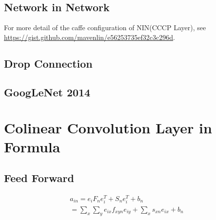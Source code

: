 \documentclass[12pt]{article}
\begin{document}
    \subsection{Network in Network}
    
    For more detail of the caffe configuration of NIN(CCCP Layer), see \url{https://gist.github.com/mavenlin/e56253735ef32c3c296d}.
    \subsection{Drop Connection}
    
    \subsection{GoogLeNet 2014}

\section{Colinear Convolution Layer in Formula}
    \subsection{Feed Forward}
    \begin{equation}
    \begin{array}{l}
    a_{in} = e_iF_ne_i^T + S_ne_i^T + b_n \\
    = \sum_x \sum_y e_{ix}f_{xyn}e_{iy} + \sum_x s_{xn}e_{ix} + b_n
    \end{array}
    \end{equation}
\end{document}
